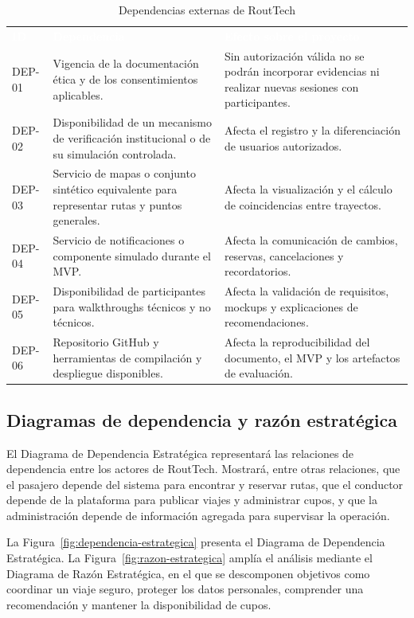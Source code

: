 \documentclass[12pt,a4paper]{article}
\begin{document}
\begin{table}[H]
\centering
\caption{Dependencias externas de RoutTech}
\label{tab:dependencias}
\small
{}
\begin{tabularx}{\textwidth}{C{1.35cm} Y Y}
\textcolor{white}{\textbf{ID}} &
\textcolor{white}{\textbf{Dependencia}} &
\textcolor{white}{\textbf{Efecto sobre el proyecto}}\\
DEP-01 & Vigencia de la documentación ética y de los consentimientos aplicables. & Sin autorización válida no se podrán incorporar evidencias ni realizar nuevas sesiones con participantes.\\
DEP-02 & Disponibilidad de un mecanismo de verificación institucional o de su simulación controlada. & Afecta el registro y la diferenciación de usuarios autorizados.\\
DEP-03 & Servicio de mapas o conjunto sintético equivalente para representar rutas y puntos generales. & Afecta la visualización y el cálculo de coincidencias entre trayectos.\\
DEP-04 & Servicio de notificaciones o componente simulado durante el MVP. & Afecta la comunicación de cambios, reservas, cancelaciones y recordatorios.\\
DEP-05 & Disponibilidad de participantes para walkthroughs técnicos y no técnicos. & Afecta la validación de requisitos, mockups y explicaciones de recomendaciones.\\
DEP-06 & Repositorio GitHub y herramientas de compilación y despliegue disponibles. & Afecta la reproducibilidad del documento, el MVP y los artefactos de evaluación.\\
\end{tabularx}
\end{table}

\subsection{Diagramas de dependencia y razón estratégica}

El Diagrama de Dependencia Estratégica representará las relaciones de dependencia entre los actores de RoutTech. Mostrará, entre otras relaciones, que el pasajero depende del sistema para encontrar y reservar rutas, que el conductor depende de la plataforma para publicar viajes y administrar cupos, y que la administración depende de información agregada para supervisar la operación.

La Figura~\ref{fig:dependencia-estrategica} presenta el Diagrama de Dependencia Estratégica. La Figura~\ref{fig:razon-estrategica} amplía el análisis mediante el Diagrama de Razón Estratégica, en el que se descomponen objetivos como coordinar un viaje seguro, proteger los datos personales, comprender una recomendación y mantener la disponibilidad de cupos.
\end{document}
